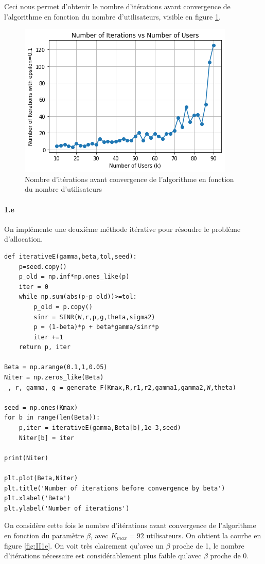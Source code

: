 \documentclass[a4paper,11pt,2]{article}
\begin{document}
Ceci nous permet d'obtenir le nombre d'itérations avant convergence de l'algorithme en fonction du nombre d'utilisateurs, visible en figure \ref{fig:II1d}.
\begin{figure}[h]
\centering
\includegraphics[width=0.7\linewidth]{./Images/II-1d.png}
\caption{Nombre d'itérations avant convergence de l'algorithme en fonction du nombre d'utilisateurs}
\label{fig:II1d}
\end{figure}

\paragraph{1.e} On implémente une deuxième méthode itérative pour résoudre le problème d'allocation.
\begin{center}
\begin{lstlisting}
def iterativeE(gamma,beta,tol,seed):
    p=seed.copy()
    p_old = np.inf*np.ones_like(p)
    iter = 0
    while np.sum(abs(p-p_old))>=tol:
        p_old = p.copy()
        sinr = SINR(W,r,p,g,theta,sigma2)
        p = (1-beta)*p + beta*gamma/sinr*p
        iter +=1
    return p, iter

Beta = np.arange(0.1,1,0.05)
Niter = np.zeros_like(Beta)
_, r, gamma, g = generate_F(Kmax,R,r1,r2,gamma1,gamma2,W,theta)

seed = np.ones(Kmax)
for b in range(len(Beta)):
    p,iter = iterativeE(gamma,Beta[b],1e-3,seed)
    Niter[b] = iter

print(Niter)

plt.plot(Beta,Niter)
plt.title('Number of iterations before convergence by beta')
plt.xlabel('Beta')
plt.ylabel('Number of iterations')
\end{lstlisting}
\end{center}

On considère cette fois le nombre d'itérations avant convergence de l'algorithme en fonction du paramètre $\beta$, avec $K_{max}=92$ utilisateurs. On obtient la courbe en figure \ref{fig:II1e}. On voit très clairement qu'avec un $\beta$ proche de 1, le nombre d'itérations nécessaire est considérablement plus faible qu'avec $\beta$ proche de 0.
\end{document}
